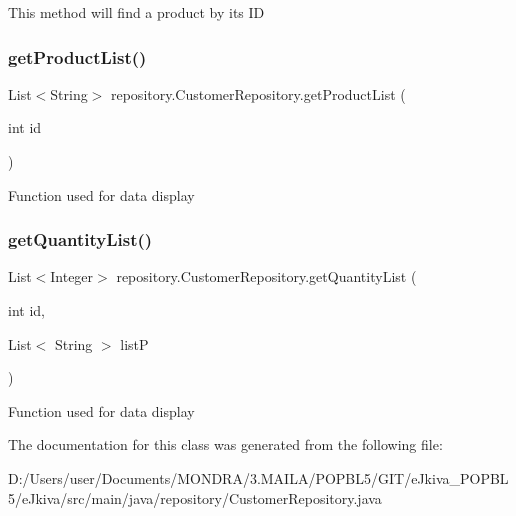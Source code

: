 This method will find a product by its ID \mbox{\label{classrepository_1_1_customer_repository_a18f31c471b0a4adfacd1ea23499cb02b}} 
\subsubsection{\texorpdfstring{get\+Product\+List()}{getProductList()}}
{\footnotesize\ttfamily List$<$String$>$ repository.\+Customer\+Repository.\+get\+Product\+List (\begin{DoxyParamCaption}\item[{int}]{id }\end{DoxyParamCaption})\hspace{0.3cm}{\ttfamily [inline]}}

Function used for data display \mbox{\label{classrepository_1_1_customer_repository_aaf10d05eb98d9995edda61c3fe5e04f2}} 
\subsubsection{\texorpdfstring{get\+Quantity\+List()}{getQuantityList()}}
{\footnotesize\ttfamily List$<$Integer$>$ repository.\+Customer\+Repository.\+get\+Quantity\+List (\begin{DoxyParamCaption}\item[{int}]{id,  }\item[{List$<$ String $>$}]{listP }\end{DoxyParamCaption})\hspace{0.3cm}{\ttfamily [inline]}}

Function used for data display 

The documentation for this class was generated from the following file\+:\begin{DoxyCompactItemize}
\item 
D\+:/\+Users/user/\+Documents/\+M\+O\+N\+D\+R\+A/3.\+M\+A\+I\+L\+A/\+P\+O\+P\+B\+L5/\+G\+I\+T/e\+Jkiva\+\_\+\+P\+O\+P\+B\+L5/e\+Jkiva/src/main/java/repository/Customer\+Repository.\+java\end{DoxyCompactItemize}
